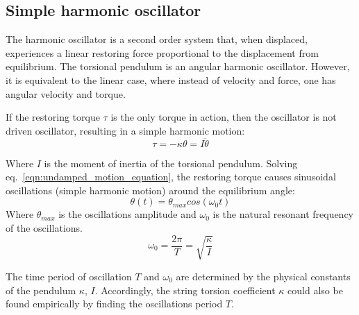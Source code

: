 \documentclass[\main/master.tex]{subfiles}
\begin{document}
\subsection{Simple harmonic oscillator}
The harmonic oscillator is a second order system that, when displaced, experiences a linear restoring force proportional to the displacement from equilibrium. The torsional pendulum is an angular harmonic oscillator. However, it is equivalent to the linear case, where instead of velocity and force, one has angular velocity and torque.
\par\noindent
If the restoring torque $\tau$ is the only torque in action, then the oscillator is not driven oscillator, resulting in a simple harmonic motion:
\begin{equation}
\tau = -\kappa\theta  = I\ddot{\theta}   \label{eqn:undamped_motion_equation}
\end{equation}
\par\noindent
Where $I$ is the moment of inertia of the torsional pendulum. Solving eq.~\ref{eqn:undamped_motion_equation}, the restoring torque causes sinusoidal oscillations (simple harmonic motion) around the equilibrium angle:  
\begin{equation}
\theta(t) = \theta_{max}cos(\omega_0 t )    \label{eqn:undamped_motion_equation_solved}
\end{equation}
Where $\theta_{max}$ is the oscillations amplitude and $\omega_0$ is the natural resonant frequency of the oscillations.
\begin{equation}
\omega_0  = \frac{2\pi}{T} = \sqrt{\frac{\kappa}{I}}   \label{eqn:undamped_omega}
\end{equation}
\par\noindent
The time period of oscillation $T$ and $\omega_0$ are determined by the physical constants of the pendulum $\kappa$, $I$. Accordingly, the string torsion coefficient $\kappa$ could also be found empirically by finding the oscillations period $T$.
\end{document}
